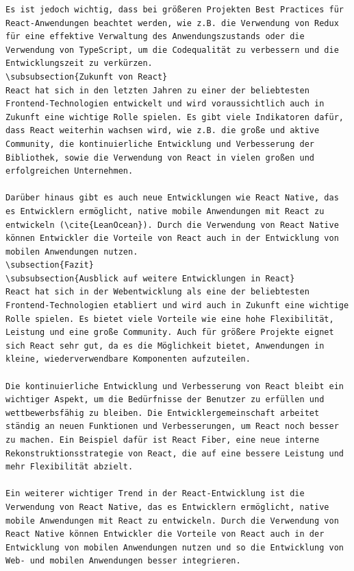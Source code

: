 \begin{lstlisting}
Es ist jedoch wichtig, dass bei größeren Projekten Best Practices für React-Anwendungen beachtet werden, wie z.B. die Verwendung von Redux für eine effektive Verwaltung des Anwendungszustands oder die Verwendung von TypeScript, um die Codequalität zu verbessern und die Entwicklungszeit zu verkürzen.
\subsubsection{Zukunft von React}
React hat sich in den letzten Jahren zu einer der beliebtesten Frontend-Technologien entwickelt und wird voraussichtlich auch in Zukunft eine wichtige Rolle spielen. Es gibt viele Indikatoren dafür, dass React weiterhin wachsen wird, wie z.B. die große und aktive Community, die kontinuierliche Entwicklung und Verbesserung der Bibliothek, sowie die Verwendung von React in vielen großen und erfolgreichen Unternehmen.

Darüber hinaus gibt es auch neue Entwicklungen wie React Native, das es Entwicklern ermöglicht, native mobile Anwendungen mit React zu entwickeln (\cite{LeanOcean}). Durch die Verwendung von React Native können Entwickler die Vorteile von React auch in der Entwicklung von mobilen Anwendungen nutzen.
\subsection{Fazit}
\subsubsection{Ausblick auf weitere Entwicklungen in React}
React hat sich in der Webentwicklung als eine der beliebtesten Frontend-Technologien etabliert und wird auch in Zukunft eine wichtige Rolle spielen. Es bietet viele Vorteile wie eine hohe Flexibilität, Leistung und eine große Community. Auch für größere Projekte eignet sich React sehr gut, da es die Möglichkeit bietet, Anwendungen in kleine, wiederverwendbare Komponenten aufzuteilen.

Die kontinuierliche Entwicklung und Verbesserung von React bleibt ein wichtiger Aspekt, um die Bedürfnisse der Benutzer zu erfüllen und wettbewerbsfähig zu bleiben. Die Entwicklergemeinschaft arbeitet ständig an neuen Funktionen und Verbesserungen, um React noch besser zu machen. Ein Beispiel dafür ist React Fiber, eine neue interne Rekonstruktionsstrategie von React, die auf eine bessere Leistung und mehr Flexibilität abzielt.

Ein weiterer wichtiger Trend in der React-Entwicklung ist die Verwendung von React Native, das es Entwicklern ermöglicht, native mobile Anwendungen mit React zu entwickeln. Durch die Verwendung von React Native können Entwickler die Vorteile von React auch in der Entwicklung von mobilen Anwendungen nutzen und so die Entwicklung von Web- und mobilen Anwendungen besser integrieren.


\end{lstlisting}
